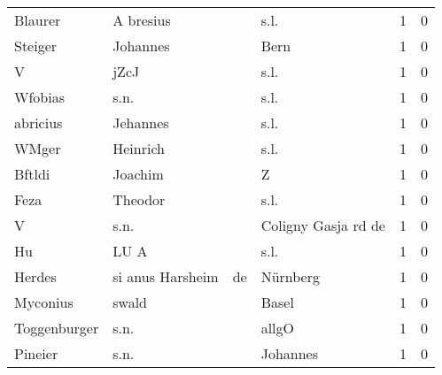 \documentclass[10pt,a4paper,landscape]{article}
\begin{document}
\begin{longtable}{llllrr}
                  Blaurer &                          A bresius &             &                                        s.l. &          1 &         0 \\
                  Steiger &                           Johannes &             &                                        Bern &          1 &         0 \\
                        V &                               jZcJ &             &                                        s.l. &          1 &         0 \\
                  Wfobias &                               s.n. &             &                                        s.l. &          1 &         0 \\
                 abricius &                           Jehannes &             &                                        s.l. &          1 &         0 \\
                    WMger &                           Heinrich &             &                                        s.l. &          1 &         0 \\
                   Bftldi &                            Joachim &             &                                           Z &          1 &         0 \\
                     Feza &                            Theodor &             &                                        s.l. &          1 &         0 \\
                        V &                               s.n. &             &                         Coligny Gasja rd de &          1 &         0 \\
                       Hu &                               LU A &             &                                        s.l. &          1 &         0 \\
                   Herdes &                   si anus Harsheim &          de &                                    Nürnberg &          1 &         0 \\
                 Myconius &                              swald &             &                                       Basel &          1 &         0 \\
             Toggenburger &                               s.n. &             &                                       allgO &          1 &         0 \\
                  Pineier &                               s.n. &             &                                    Johannes &          1 &         0 \\

\end{longtable}
\end{document}
